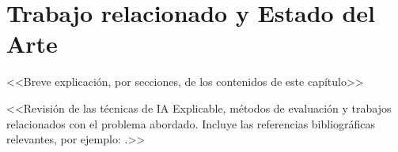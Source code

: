 \chapter{Trabajo relacionado y Estado del Arte} \label{chp:state-of-the-art}

<<Breve explicación, por secciones, de los contenidos de este capítulo>>


<<Revisión de las técnicas de IA Explicable, métodos de evaluación y trabajos relacionados con el problema abordado. Incluye las referencias bibliográficas relevantes, por ejemplo: \cite{stallings2006}.>>